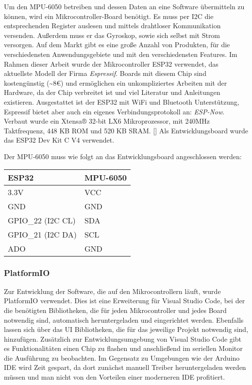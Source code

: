 Um den MPU-6050 betreiben und dessen Daten an eine Software übermitteln
zu können, wird ein Mikrocontroller-Board benötigt. Es muss per I2C die
entsprechenden Register auslesen und mittels drahtloser Kommunikation
versenden. Außerdem muss er das Gyroskop, sowie sich selbst mit Strom
versorgen. Auf dem Markt gibt es eine große Anzahl von Produkten, für
die verschiedensten Anwendungsgebiete und mit den verschiedensten
Features. Im Rahmen dieser Arbeit wurde der Mikrocontroller ESP32
verwendet, das aktuellste Modell der Firma \emph{Espressif}. Boards mit
diesem Chip sind kostengünstig (\textasciitilde8€) und ermöglichen ein
unkompliziertes Arbeiten mit der Hardware, da der Chip verbreitet ist
und viel Literatur und Anleitungen existieren. Ausgestattet ist der
ESP32 mit WiFi und Bluetooth Unterstützung, Espressif bietet aber auch
ein eigenes Verbindungsprotokoll an: \emph{ESP-Now}. Verbaut wurde ein
Xtensa® 32-bit LX6 Mikroprozessor, mit 240MHz Taktfrequenz, 448 KB ROM
und 520 KB SRAM. {[}\citep{ESP32Datasheet2022}{]} Als Entwicklungsboard
wurde das ESP32 Dev Kit C V4 verwendet.

Der MPU-6050 muss wie folgt an das Entwicklungsboard angeschlossen
werden:

\begin{longtable}[]{@{}ll@{}}
\toprule()
ESP32 & MPU-6050 \\
\midrule()
\endhead
3.3V & VCC \\
GND & GND \\
GPIO\_22 (I2C CL) & SDA \\
GPIO\_21 (I2C DA) & SCL \\
ADO & GND \\
\bottomrule()
\end{longtable}

\hypertarget{platformio}{%
\subsubsection{PlatformIO}\label{platformio}}

Zur Entwicklung der Software, die auf den Mikrocontrollern läuft, wurde
PlatformIO verwendet. Dies ist eine Erweiterung für Visual Studio Code,
bei der die benötigten Bibliotheken, die für jeden Mikrocontroller und
jedes Board notwendig sind, automatisch heruntergeladen und eingerichtet
werden. Ebenfalls lassen sich über das UI Bibliotheken, die für das
jeweilige Projekt notwendig sind, hinzufügen. Zusätzlich zur
Entwicklungsumgebung von Visual Studio Code gibt es Funktionalitäten
einen Chip zu flashen und anschließend im seriellen Monitor die
Ausführung zu beobachten. Im Gegensatz zu Umgebungen wie der Arduino IDE
wird Zeit gespart, da dort zunächst manuell Treiber heruntergeladen
werden müssen und man nicht von den Vorteilen einer moderneren IDE
profitiert.

